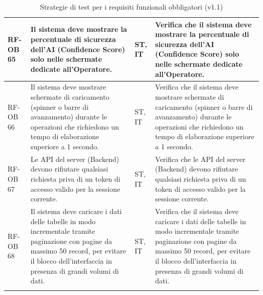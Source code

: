 \documentclass[a4paper,11pt,oneside]{scrartcl}
\begin{document}
\begin{longtable}{|p{1.5cm}|p{4.5cm}|p{1.8cm}|p{6cm}|}
    RF-OB 65         & Il sistema deve mostrare la percentuale di sicurezza dell'AI (Confidence Score) solo nelle schermate dedicate all'Operatore.                                                                                                                                                                          & ST, IT             & Verifica che il sistema deve mostrare la percentuale di sicurezza dell'AI (Confidence Score) solo nelle schermate dedicate all'Operatore.                                                                                                                                                                          \\ \hline
    RF-OB 66         & Il sistema deve mostrare schermate di caricamento (spinner o barre di avanzamento) durante le operazioni che richiedono un tempo di elaborazione superiore a 1 secondo.                                                                                                                               & ST, IT             & Verifica che il sistema deve mostrare schermate di caricamento (spinner o barre di avanzamento) durante le operazioni che richiedono un tempo di elaborazione superiore a 1 secondo.                                                                                                                               \\ \hline
    RF-OB 67         & Le API del server (Backend) devono rifiutare qualsiasi richiesta priva di un token di accesso valido per la sessione corrente.                                                                                                                                                                        & ST, IT             & Verifica che le API del server (Backend) devono rifiutare qualsiasi richiesta priva di un token di accesso valido per la sessione corrente.                                                                                                                                                                        \\ \hline
    RF-OB 68         & Il sistema deve caricare i dati delle tabelle in modo incrementale tramite paginazione con pagine da massimo 50 record, per evitare il blocco dell'interfaccia in presenza di grandi volumi di dati.                                                                                                  & ST, IT             & Verifica che il sistema deve caricare i dati delle tabelle in modo incrementale tramite paginazione con pagine da massimo 50 record, per evitare il blocco dell'interfaccia in presenza di grandi volumi di dati.                                                                                                  \\ \hline
    \caption{Strategie di test per i requisiti funzionali obbligatori (v1.1)}
\end{longtable}
\end{document}
